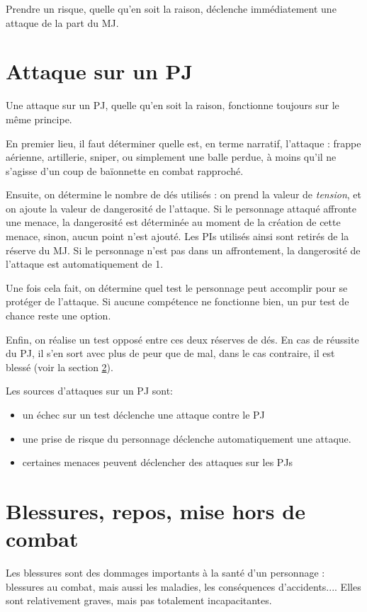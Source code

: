 \documentclass{report}
\begin{document}
\begin{multicols}{2}
Prendre un risque, quelle qu'en soit la raison, déclenche immédiatement une attaque de la part du MJ.
\section{Attaque sur un PJ}
\label{attaque}
Une attaque sur un PJ, quelle qu'en soit la raison, fonctionne toujours sur le même principe.

En premier lieu, il faut déterminer quelle est, en terme narratif, l'attaque : frappe aérienne, artillerie, sniper, ou simplement une balle perdue, à moins qu'il ne s'agisse d'un coup de baïonnette en combat rapproché.

Ensuite, on détermine le nombre de dés utilisés : on prend la valeur de \emph{tension}, et on ajoute la valeur de dangerosité de l'attaque. Si le personnage attaqué affronte une menace, la dangerosité est déterminée au moment de la création de cette menace, sinon, aucun point n'est ajouté. Les PIs utilisés ainsi sont retirés de la réserve du MJ. Si le personnage n'est pas dans un affrontement, la dangerosité de l'attaque est automatiquement de 1.

Une fois cela fait, on détermine quel test le personnage peut accomplir pour se protéger de l'attaque. Si aucune compétence ne fonctionne bien, un pur test de chance reste une option. 

Enfin, on réalise un test opposé entre ces deux réserves de dés. En cas de réussite du PJ, il s'en sort avec plus de peur que de mal, dans le cas contraire, il est blessé (voir la section \ref{blessure}).

Les sources d'attaques sur un PJ sont:
\begin{itemize}
    \item un échec sur un test déclenche une attaque contre le PJ
    \item une prise de risque du personnage déclenche automatiquement une attaque.
    \item certaines menaces peuvent déclencher des attaques sur les PJs
\end{itemize}

\section{Blessures, repos, mise hors de combat}
\label{blessure}
Les blessures sont des dommages importants à la santé d'un personnage : blessures au combat, mais aussi les maladies, les conséquences d'accidents.... Elles sont relativement graves, mais pas totalement incapacitantes.


\end{multicols}
\end{document}
